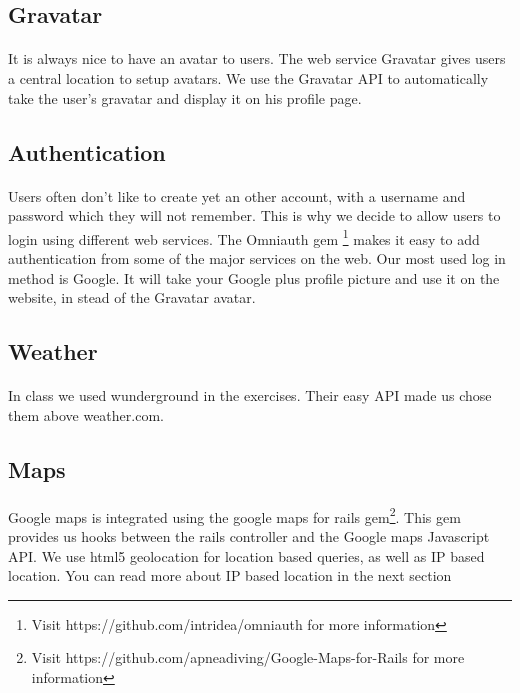 \documentclass[11pt,a4paper]{scrartcl}
\begin{document}
\subsection{Gravatar}
\paragraph{}It is always nice to have an avatar to users. The web service Gravatar gives users a central location to setup avatars. We use the Gravatar API to automatically take the user's gravatar and display it on his profile page.
\subsection{Authentication}
\paragraph{}Users often don't like to create yet an other account, with a username and password which they will not remember. This is why we decide to allow users to login using different web services. The Omniauth gem \footnote{Visit https://github.com/intridea/omniauth for more information} makes it easy to add authentication from some of the major services on the web. Our most used log in method is Google. It will take your Google plus profile picture and use it on the website, in stead of the Gravatar avatar.
\subsection{Weather}
\paragraph{}In class we used wunderground in the exercises. Their easy API made us chose them above weather.com.
\subsection{Maps}
\paragraph{}Google maps is integrated using the google maps for rails gem\footnote{Visit https://github.com/apneadiving/Google-Maps-for-Rails for more information}. This gem provides us hooks between the rails controller and the Google maps Javascript API. We use html5 geolocation for location based queries, as well as IP based location. You can read more about IP based location in the next section
\end{document}
